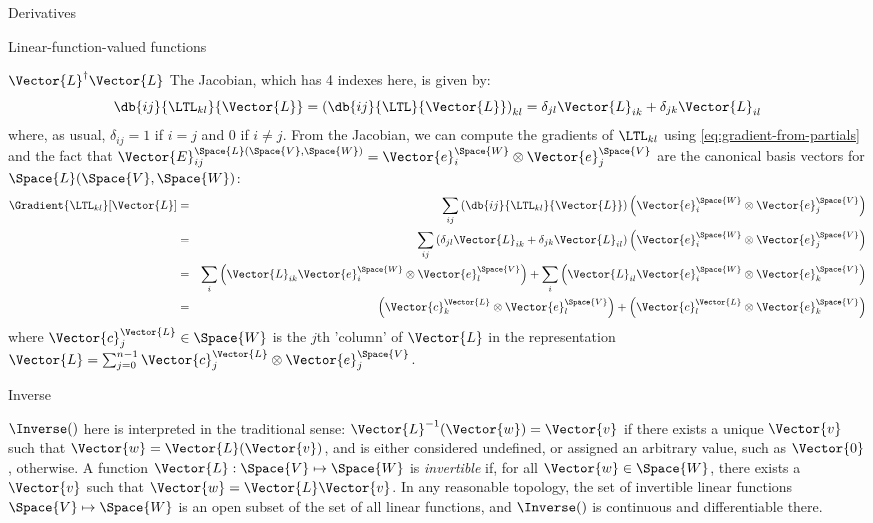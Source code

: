 \begin{plSection}{Derivatives}
\begin{plSection}{Linear-function-valued functions}
\begin{plSection}{\texorpdfstring{$\Vector{L}^{\dagger} \Vector{L}$}{LTL}}
The Jacobian, which has 4 indexes here, is given by:
\begin{equation}
\db{ij}{\LTL_{kl}}{\Vector{L}}
 =
\left( \db{ij}{\LTL}{\Vector{L}} \right)_{kl}
=
\delta_{jl} \Vector{L}_{ik}
+
\delta_{jk} \Vector{L}_{il}
\end{equation}
where, as usual, $\delta_{ij} = 1$ if $i=j$ and  $0$ if $i \neq j$.
From the Jacobian, we can compute the gradients of $\LTL_{kl}$
using \cref{eq:gradient-from-partials}
and the fact that
$\Vector{E}_{ij}^{\Space{L}(\Space{V},\Space{W})}  = \Vector{e}_i^{\Space{W}} \otimes \Vector{e}_j^{\Space{V}}$
are the canonical basis vectors for $\Space{L}(\Space{V},\Space{W})$:
\begin{eqnarray}
\Gradient{\LTL_{kl}}[\Vector{L}]
& = &
\sum_{ij}
\left( \db{ij}{\LTL_{kl}}{\Vector{L}} \right)
\left( \Vector{e}_i^{\Space{W}} \otimes \Vector{e}_j^{\Space{V}} \right)
\\
& = &
\sum_{ij}
\left( \delta_{jl} \Vector{L}_{ik} + \delta_{jk} \Vector{L}_{il} \right)
\left( \Vector{e}_i^{\Space{W}} \otimes \Vector{e}_j^{\Space{V}} \right)
\nonumber
\\
& = &
\sum_{i}
\left(
\Vector{L}_{ik}  \Vector{e}_i^{\Space{W}} \otimes \Vector{e}_l^{\Space{V}}
\right)
+
\sum_{i}
\left(
\Vector{L}_{il}  \Vector{e}_i^{\Space{W}} \otimes \Vector{e}_k^{\Space{V}}
\right)
\nonumber
\\
& = &
\left(
\Vector{c}_k^{\Vector{L}} \otimes \Vector{e}_l^{\Space{V}}
\right)
+
\left(
\Vector{c}_l^{\Vector{L}} \otimes \Vector{e}_k^{\Space{V}}
\right)
\nonumber
\end{eqnarray}
where $\Vector{c}_j^{\Vector{L}} \in \Space{W}$ is the $j$th 'column' of $\Vector{L}$
in the representation
$\Vector{L} = \sum_{j=0}^{n-1} \Vector{c}_j^{\Vector{L}} \otimes \Vector{e}_j^{\Space{V}}$.

\end{plSection}%
\begin{plSection}{Inverse}
\label{sec:Derivative-of-inverse}

$\Inverse()$ here is interpreted in the traditional sense:
$\Vector{L}^{-1}(\Vector{w}) = \Vector{v}$ if there exists a unique $\Vector{v}$ such that $\Vector{w} = \Vector{L}(\Vector{v})$,
and is either considered undefined, or assigned an arbitrary
value, such as $\Vector{0}$, otherwise.
A function $\Vector{L} : \Space{V} \mapsto \Space{W}$ is \textit{invertible}
if, for all $\Vector{w} \in \Space{W}$, there exists a $\Vector{v}$ such that
$\Vector{w} = \Vector{L} \Vector{v}$.
In any reasonable topology,
the set of invertible linear functions $\Space{V} \mapsto \Space{W}$
is an open subset of the set of all linear functions,
and $\Inverse()$ is continuous and differentiable there.


\end{plSection}
\end{plSection}
\end{plSection}
